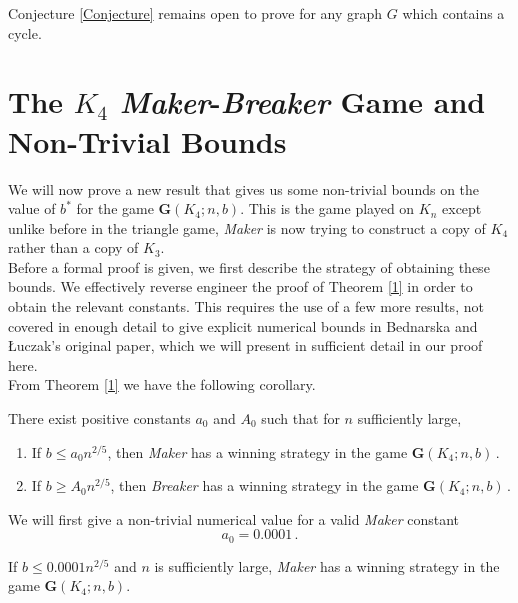 \documentclass[a4paper,oneside,11pt]{report}
\begin{document}
Conjecture \ref{Conjecture} remains open to prove for any graph $G$ which contains a cycle.

\chapter{The $K_4$ \textit{Maker}-\textit{Breaker} Game and Non-Trivial Bounds}

We will now prove a new result that gives us some non-trivial bounds on the value of $b^*$ for the game $\textbf{G}(K_4;n,b)$.
This is the game played on $K_n$ except unlike before in the triangle game, \textit{Maker} is now trying to construct a copy of $K_4$ rather than a copy of $K_3$. \\

Before a formal proof is given, we first describe the strategy of obtaining these bounds. We effectively reverse engineer the proof of Theorem \ref{1} in order to obtain the relevant constants. This requires the use of a few more results, not covered in enough detail to give explicit numerical bounds in Bednarska and \L{}uczak's original paper, which we will present in sufficient detail in our proof here.\\

From Theorem \ref{1} we have the following corollary. 

\begin{corollary}

There exist positive constants $a_0$ and $A_0$ such that for $n$ sufficiently large,

\begin{enumerate}
    
    \item If $b \leqslant a_0n^{2/5}$, then \textit{Maker} has a winning strategy in the game $\textbf{G}(K_4;n,b)\,.$ 
    
    \item If $b \geqslant A_0n^{2/5}$, then \textit{Breaker} has a winning strategy in the game $\textbf{G}(K_4;n,b)\,.$

\end{enumerate}
    
\end{corollary}

We will first give a non-trivial numerical value for a valid \textit{Maker} constant \[a_0 = 0.0001 \,.\]

\begin{theorem}{\label{4}}

     If $b \leqslant 0.0001n^{2/5}$ and $n$ is sufficiently large, \textit{Maker} has a winning strategy in the game $\textbf{G}(K_4;n,b)$.
     
\end{theorem}
\end{document}
